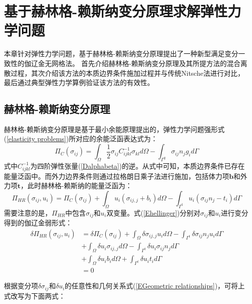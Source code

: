 \chapter{基于赫林格-赖斯纳变分原理求解弹性力学问题}
本章针对弹性力学问题，基于赫林格-赖斯纳变分原理提出了一种新型满足变分一致性的伽辽金无网格法。
首先介绍赫林格-赖斯纳变分原理及其所提方法的混合离散过程，其次介绍该方法的本质边界条件施加过程并与传统Nitsche法进行对比，最后通过典型弹性力学算例验证该方法的有效性。
\section{赫林格-赖斯纳变分原理}
赫林格-赖斯纳变分原理\cite{钱伟长1985广义变分原理}是基于最小余能原理提出的，弹性力学问题强形式(\ref{elasticity problems})所对应的余能泛函表达式为：
\begin{equation}
\Pi_C(\sigma_{ij}) = \int_\Omega \frac{1}{2}\sigma_{ij}C_{ijkl}^{-1}\sigma_{kl} d\Omega - \int_{\Gamma^g} \sigma_{ij} n_j g_i d\Gamma
\end{equation}
式中$C_{ijkl}^{-1}$为四阶弹性张量(\ref{Dalphabeta})的逆。从式中可知，本质边界条件已存在能量泛函中。而外力边界条件则通过拉格朗日乘子法进行施加，包括体力项$\pmb b$和外力项$\pmb t$，此时赫林格-赖斯纳的能量泛函为：
\begin{equation}
\label{Ehellinger}
    \Pi_{H\!R}(\sigma_{ij},u_i)=\Pi_C(\sigma_{ij})
    +\int_{\Omega}u_i(\sigma_{ij,j}+b_i)d\Omega-\int_{\Gamma^t}u_i(\sigma_{ij} n_j-t_i)d\Gamma
\end{equation}
需要注意的是，$\Pi_{HR}$中包含$\sigma_{ij}$和$u_i$双变量。式(\ref{Ehellinger})分别对$\sigma_{ij}$和$u_i$进行变分得到的伽辽金弱形式：
\begin{equation}\label{weak form1}
\begin{split} 
    \delta\Pi_{H\!R}(\sigma_{ij},u_i)&=\delta\Pi_C(\sigma_{ij})+\int_{\Omega}\delta\sigma_{ij,j}u_id\Omega-\int_{\Gamma^t}\delta\sigma_{ij}n_ju_id\Gamma\\
    &+\int_{\Omega}\delta u_i\sigma_{ij,j}d\Omega-\int_{\Gamma^t}\delta u_i\sigma_{ij}n_jd\Gamma\\
    &+\int_{\Omega}\delta u_ib_id\Omega+\int_{\Gamma^t}\delta u_it_id\Gamma\\
    &=0
\end{split}
\end{equation}\par
根据变分项$\delta \sigma_{ij}$和$\delta u_i$的任意性和几何关系式(\ref{EGeometric relationships})，可将上式改写为下面两式：
